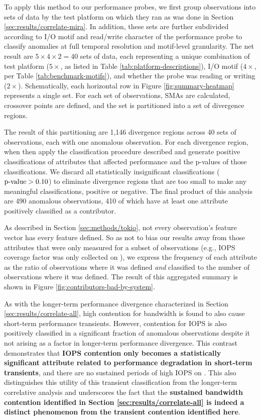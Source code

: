 To apply this method to our performance probes, we first group observations into sets of data by the test platform on which they ran as was done in Section \ref{sec:results/correlate-mira}.
In addition, these sets are further subdivided according to I/O motif and read/write character of the performance probe to classify anomalies at full temporal resolution and motif-level granularity.
The net result are $5 \times 4 \times 2 = 40$ sets of data, each representing a unique combination of test platform ($5 \times$, as listed in Table \ref{tab:platform-descriptions}), I/O motif ($4 \times$, per Table \ref{tab:benchmark-motifs}), and whether the probe was reading or writing ($2 \times$).
Schematically, each horizontal row in Figure \ref{fig:summary-heatmap} represents a single set.
For each set of observations, SMAs are calculated, crossover points are defined, and the set is partitioned into a set of divergence regions.

The result of this partitioning are 1,146 divergence regions across 40 sets of observations, each with one anomalous observation.
For each divergence region, when then apply the classification procedure described and generate positive classifications of attributes that affected performance and the p-values of those classifications.
We discard all statistically insignificant classifications ($\textup{p-value} > 0.10$) to eliminate divergence regions that are too small to make any meaningful classifications, positive or negative.
The final product of this analysis are 490 anomalous observations, 410 of which have at least one attribute positively classified as a contributor.

As described in Section \ref{sec:methods/tokio}, not every observation's feature vector has every feature defined.
So as not to bias our results away from those attributes that were only measured for a subset of observations (e.g., IOPS coverage factor was only collected on \mira), we express the frequency of each attribute as the ratio of observations where it was defined \emph{and} classified to the number of observations where it was defined.
The result of this aggregated summary is shown in Figure \ref{fig:contributors-bad-by-system}.

As with the longer-term performance divergence characterized in Section \ref{sec:results/correlate-all}, high contention for bandwidth is found to also cause short-term performance transients.
However, contention for IOPS is also positively classified in a significant fraction of anomalous observations despite it not arising as a factor in longer-term performance divergence.
This contrast demonstrates that \textbf{IOPS contention only becomes a statistically significant attribute related to performance degradation in short-term transients}, and there are no sustained periods of high IOPS on \mirafsone.
This also distinguishes this utility of this transient classification from the longer-term correlative analysis and underscores the fact that the \textbf{sustained bandwidth contention identified in Section \ref{sec:results/correlate-all} is indeed a distinct phenomenon from the transient contention identified here}.

